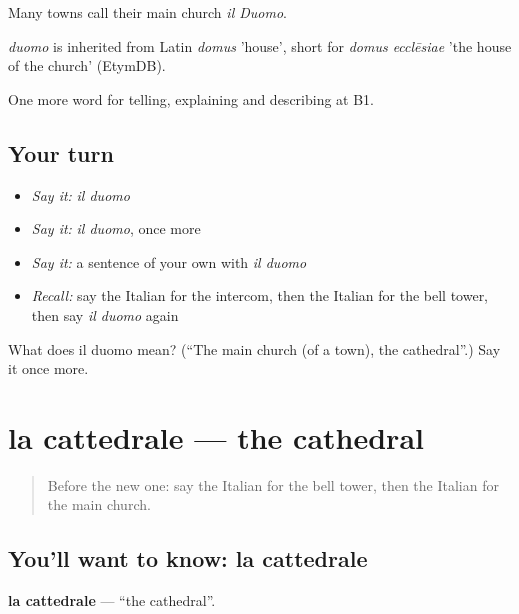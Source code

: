 Many towns call their main church \emph{il Duomo}.

\begin{cousinweb}
\emph{duomo} is inherited from Latin \emph{domus} 'house', short for \emph{domus ecclēsiae} 'the house of the church' (EtymDB).
\end{cousinweb}

\begin{grammarlens}[title={What you've built}]
One more word for telling, explaining and describing at B1.
\end{grammarlens}

\subsection*{Your turn}
\begin{itemize}
\raggedright
  \item \emph{Say it:} \emph{il duomo}
  \item \emph{Say it:} \emph{il duomo}, once more
  \item \emph{Say it:} a sentence of your own with \emph{il duomo}
  \item \emph{Recall:} say the Italian for the intercom, then the Italian for the bell tower, then say \emph{il duomo} again
\end{itemize}

\begin{tcolorbox}[breakable,colback=teal!4,colframe=teal!35!black,title={Before you move on}]
What does il duomo mean? (\textquotedblleft{}The main church (of a town), the cathedral\textquotedblright{}.) Say it once more.
\end{tcolorbox}
\section[la cattedrale]{la cattedrale — the cathedral}

\label{lesson:IT-C445-cattedrale}



\begin{quote}
Before the new one: say the Italian for the bell tower, then the Italian for the main church.
\end{quote}

\subsection*{You'll want to know: la cattedrale}
\textbf{la cattedrale} — \textquotedblleft{}the cathedral\textquotedblright{}.

